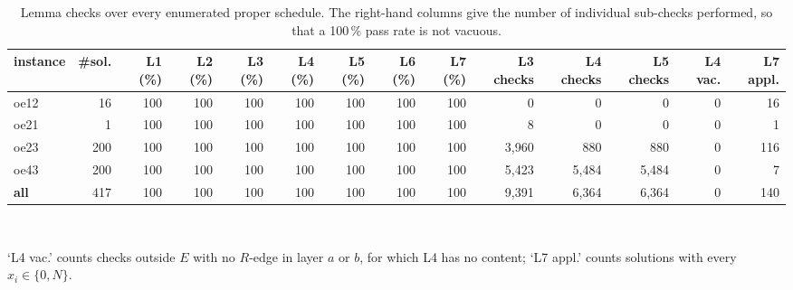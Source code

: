 \begin{table}[tb]
\centering
\small
\caption{Lemma checks over every enumerated proper schedule. The right-hand columns give the number of individual sub-checks performed, so that a 100\,\% pass rate is not vacuous.}
\label{tabS:lemmas}
\begin{tabular}{lrrrrrrrrrrrrr}
\toprule
instance & \#sol. & L1 (\%) & L2 (\%) & L3 (\%) & L4 (\%) & L5 (\%) & L6 (\%) & L7 (\%) & L3 checks & L4 checks & L5 checks & L4 vac. & L7 appl. \\
\midrule
oe12 & 16 & 100 & 100 & 100 & 100 & 100 & 100 & 100 & 0 & 0 & 0 & 0 & 16 \\
oe21 & 1 & 100 & 100 & 100 & 100 & 100 & 100 & 100 & 8 & 0 & 0 & 0 & 1 \\
oe23 & 200 & 100 & 100 & 100 & 100 & 100 & 100 & 100 & 3,960 & 880 & 880 & 0 & 116 \\
oe43 & 200 & 100 & 100 & 100 & 100 & 100 & 100 & 100 & 5,423 & 5,484 & 5,484 & 0 & 7 \\
\textbf{all} & 417 & 100 & 100 & 100 & 100 & 100 & 100 & 100 & 9,391 & 6,364 & 6,364 & 0 & 140 \\
\bottomrule
\end{tabular}
\\[2pt]\begin{minipage}{\linewidth}\footnotesize `L4 vac.' counts checks outside $E$ with no $R$-edge in layer $a$ or $b$, for which L4 has no content; `L7 appl.' counts solutions with every $x_i\in\{0,N\}$.\end{minipage}
\end{table}
